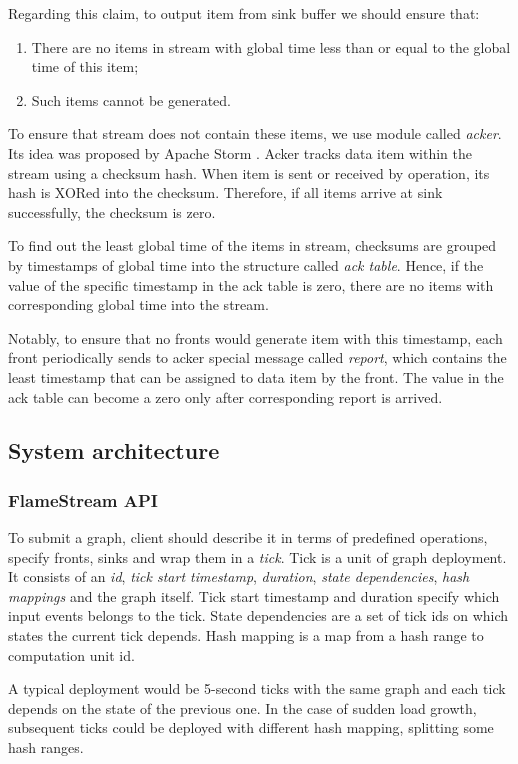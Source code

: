 Regarding this claim, to output item from sink buffer we should ensure that:
\begin{enumerate}
    \item There are no items in stream with global time less than or equal to the global time of this item;
    \item Such items cannot be generated.
\end{enumerate}

To ensure that stream does not contain these items, we use module called {\it acker}. Its idea was proposed by Apache Storm \cite{apache:storm}. Acker tracks data item within the stream using a checksum hash. When item is sent or received by operation, its hash is XORed into the checksum. Therefore, if all items arrive at sink successfully, the checksum is zero. 

To find out the least global time of the items in stream, checksums are grouped by timestamps of global time into the structure called {\it ack table}. Hence, if the value of the specific timestamp in the ack table is zero, there are no items with corresponding global time into the stream. 

Notably, to ensure that no fronts would generate item with this timestamp, each front periodically sends to acker special message called {\it report}, which contains the least timestamp that can be assigned to data item by the front. The value in the ack table can become a zero only after corresponding report is arrived.  

\subsection{System architecture}

\subsubsection{FlameStream API}
To submit a graph, client should describe it in terms of predefined operations, specify fronts, sinks and wrap them in a {\it tick}. Tick is a unit of graph deployment. It consists of an {\it id}, {\it tick start timestamp}, {\it duration}, {\it state dependencies}, {\it hash mappings} and the graph itself. Tick start timestamp and duration specify which input events belongs to the tick. State dependencies are a set of tick ids on which states the current tick depends. Hash mapping is a map from a hash range to computation unit id. 

A typical deployment would be 5-second ticks with the same graph and each tick depends on the state of the previous one. In the case of sudden load growth, subsequent ticks could be deployed with different hash mapping, splitting some hash ranges.

